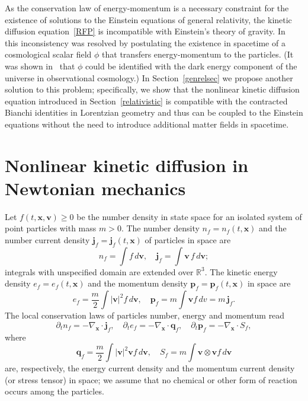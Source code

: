 \documentclass[12pt]{article}
\newcommand{\R}{\mathbb{R}}
\theoremstyle{definition}
\numberwithin{equation}{section}
\begin{document}
As the conservation law of energy-momentum is a necessary constraint for the existence of solutions to the Einstein equations of general relativity, the kinetic diffusion equation~\eqref{RFP} is incompatible with Einstein's theory of gravity. In~\cite{C} this inconsistency was resolved  
by postulating the existence in spacetime of a cosmological scalar field $\phi$ that transfers energy-momentum to the particles. 
(It was shown in~\cite{CV} that $\phi$ could be identified with the dark energy component of the universe in observational cosmology.)
In Section~\ref{genrelsec} we propose another solution to this  problem; specifically, we show that the nonlinear kinetic diffusion equation introduced in Section~\ref{relativistic} is compatible with the contracted Bianchi identities in Lorentzian geometry and thus can be coupled to the Einstein equations without the need to introduce additional matter fields in spacetime. 



\section{Nonlinear kinetic diffusion in Newtonian mechanics}\label{newtonian}
Let $f(t,{\bm x},{\bm v})\geq 0$ be the number density in state space for an isolated system of point particles with mass $m> 0$.
The number density $n_f=n_f(t,{\bm x})$ and the number current density ${\bm j}_f={\bm j}_f(t,{\bm x})$ of particles in space are
\[
n_f=\int  f\,d{\bm v},\quad {\bm j}_f= \int  {\bm v}\, f\,d{\bm v};
\]
integrals with unspecified domain are extended over $\R^3$. 
The kinetic energy density $e_f=e_f(t,{\bm x})$ and the momentum density ${\bm p}_f={\bm p}_f(t,{\bm x})$ in space are
\[
e_f=\frac{m}{2}\int  |{\bm v}|^2f\,d{\bm v},\quad {\bm p}_f=m\int  {\bm v} f\,dv=m\,{\bm j}_f.
\]
The local conservation laws of particles number, energy and momentum read
\begin{equation}\label{consloc}
\partial_t n_f =-\nabla_{\bm x}\cdot {\bm j}_f,\quad \partial_te_f=-\nabla_{\bm x}\cdot {\bm q}_f,\quad \partial_t {\bm p}_f =-\nabla_{\bm x}\cdot S_f,
\end{equation}
where
\[
{\bm q}_f=\frac{m}{2}\int  |{\bm v}|^2 {\bm v} f\,d{\bm v},\quad S_{f}=m\int  {\bm v}\otimes {\bm v} f\,d{\bm v} 
\]
are, respectively, the energy current density and the momentum current density (or stress tensor) in space; we assume that no chemical or other form of reaction occurs among the particles. 
\end{document}
